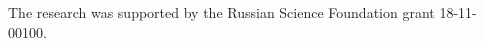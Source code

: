 \documentclass[sigconf,table,anonymous]{acmart}
\begin{document}




\begin{acks}
The research was supported by the Russian Science Foundation grant 18-11-00100.
\end{acks}

\balance




\appendix

\end{document}
